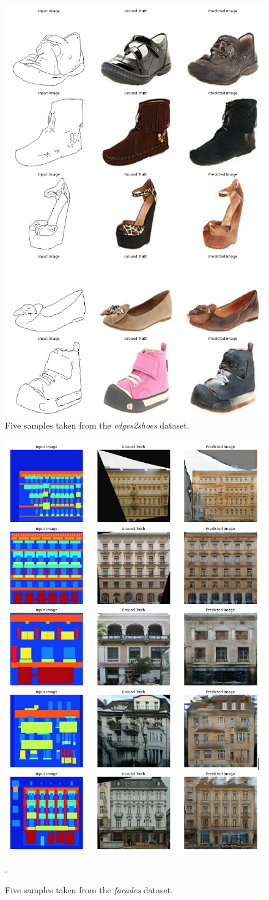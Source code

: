 \documentclass[peerreview]{IEEEtran}
\begin{document}
\begin{figure}[ht]
\centering
\includegraphics[width=0.6\columnwidth]{ex_edges2shoes.png} 
\caption{Five samples taken from the \textit{edges2shoes} dataset.}
\label{fig:ex_edges2shoes}
\end{figure}

\begin{figure}[!t]
\centering
\includegraphics[width=0.6\columnwidth]{ex_facades.png} 
\caption{Five samples taken from the \textit{facades} dataset.}.
\label{fig:ex_facades}
\end{figure}




\end{document}
